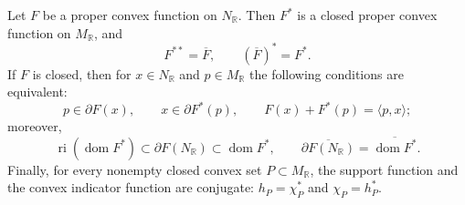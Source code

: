\begin{theorem}\label{thm:finite-dimensional-fenchel-duality}
Let $F$ be a proper convex function on $N_{\mathbb R}$. Then $F^*$ is a closed proper convex function on $M_{\mathbb R}$, and
\[
 F^{**}=\overline F,\qquad(\overline F)^*=F^*.
\]
If $F$ is closed, then for $x\in N_{\mathbb R}$ and $p\in M_{\mathbb R}$ the following conditions are equivalent:
\[
 p\in\partial F(x),\qquad x\in\partial F^*(p),\qquad
                     F(x)+F^*(p)=\langle p,x\rangle;
\]
moreover,
\[
 \operatorname{ri}(\operatorname{dom}F^*)\subset\partial F(N_{\mathbb R})
       \subset\operatorname{dom}F^*,\qquad
 \overline{\partial F(N_{\mathbb R})}
                         =\overline{\operatorname{dom}F^*}.
\]
Finally, for every nonempty closed convex set $P\subset M_{\mathbb R}$, the support function and the convex indicator function are conjugate: $h_P=\chi_P^*$ and $\chi_P=h_P^*$.
\end{theorem}
